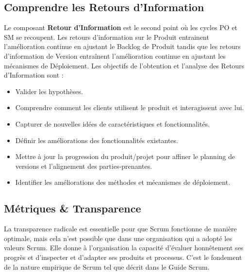\documentclass[12pt,a4paper,parskip=full]{scrartcl}
\begin{document}
\subsection{Comprendre les Retours d’Information}
Le composant \textbf{Retour d’Information} est le second point où les cycles PO et SM se
recoupent. Les retours d’information sur le Produit entrainent l’amélioration continue en ajustant le
Backlog de Produit tandis que les retours d’information de Version entraînent
l’amélioration continue en ajustant les mécanismes de Déploiement. Les objectifs de
l’obtention et l’analyse des Retours d’Information sont :
\begin{itemize}
\item Valider les hypothèses.
\item Comprendre comment les clients utilisent le produit et interagissent avec lui.
\item Capturer de nouvelles idées de caractéristiques et fonctionnalités.
\item Définir les améliorations des fonctionnalités existantes.
\item Mettre à jour la progression du produit/projet pour affiner le planning de versions et
l’alignement des parties-prenantes.
\item Identifier les améliorations des méthodes et mécanismes de déploiement.
\end{itemize}

\subsection{Métriques \& Transparence}
La transparence radicale est essentielle pour que Scrum fonctionne de manière
optimale, mais cela n'est possible que dans une organisation qui a adopté les valeurs
Scrum. Elle donne à l'organisation la capacité d'évaluer honnêtement ses progrès et
d'inspecter et d'adapter ses produits et processus. C'est le fondement de la nature
empirique de Scrum tel que décrit dans le Guide Scrum.
\end{document}
